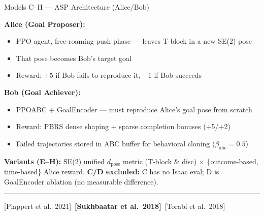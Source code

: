 \documentclass[aspectratio=169,xcolor=dvipsnames,t]{beamer}
\newcommand{\litfooter}[1]{%
  \vspace{2pt}%
  \hrule%
  \vspace{2pt}%
  {\tiny\color{LightDarkGrey} #1}%
}
\begin{document}
\begin{frame}[t]{Models C–H — ASP Architecture (Alice/Bob)}
  \vspace{-6pt}
  {\small
  \textbf{Alice (Goal Proposer):}
  \begin{itemize}
    \item PPO agent, free-roaming push phase — leaves T-block in a new SE(2) pose
    \item That pose becomes Bob's target goal
    \item Reward: $+5$ if Bob fails to reproduce it, $-1$ if Bob succeeds
  \end{itemize}

  \vspace{-2pt}
  \textbf{Bob (Goal Achiever):}
  \begin{itemize}
    \item PPOABC + GoalEncoder — must reproduce Alice's goal pose from scratch
    \item Reward: PBRS dense shaping + sparse completion bonuses (+5/+2)
    \item Failed trajectories stored in ABC buffer for behavioral cloning ($\beta_{\text{abc}}{=}0.5$)
  \end{itemize}

  \vspace{-2pt}
  \textbf{Variants (E–H):} SE(2) unified $d_{\text{pose}}$ metric (T-block \& disc) $\times$ \{outcome-based, time-based\} Alice reward.
  \textbf{C/D excluded:} C has no Isaac eval; D is GoalEncoder ablation (no measurable difference).
  }

  \vfill\litfooter{[Plappert et al.\ 2021]~\textbf{[Sukhbaatar et al.\ 2018]}~[Torabi et al.\ 2018]}
\end{frame}

\end{document}
